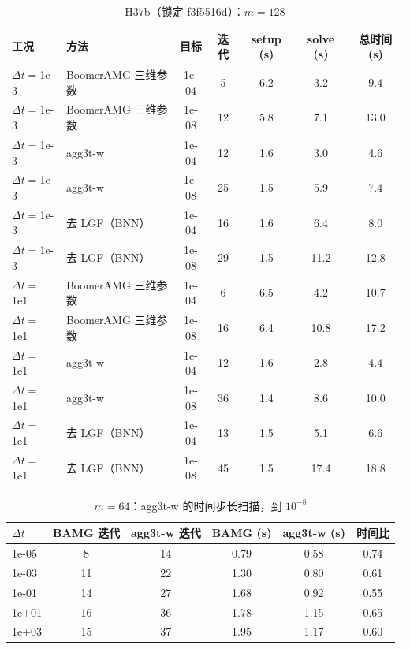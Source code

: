 \begin{table}[H]\centering\small
\caption{H37b（锁定 f3f5516d）：$m=128$}\label{tab:h37b}
\begin{tabular}{llccccc}
\toprule
工况 & 方法 & 目标 & 迭代 & setup (s) & solve (s) & 总时间 (s) \\
\midrule
$\Delta t=$1e-3 & BoomerAMG 三维参数 & 1e-04 & 5 & 6.2 & 3.2 & 9.4 \\
$\Delta t=$1e-3 & BoomerAMG 三维参数 & 1e-08 & 12 & 5.8 & 7.1 & 13.0 \\
$\Delta t=$1e-3 & agg3t-w & 1e-04 & 12 & 1.6 & 3.0 & 4.6 \\
$\Delta t=$1e-3 & agg3t-w & 1e-08 & 25 & 1.5 & 5.9 & 7.4 \\
$\Delta t=$1e-3 & 去 LGF（BNN） & 1e-04 & 16 & 1.6 & 6.4 & 8.0 \\
$\Delta t=$1e-3 & 去 LGF（BNN） & 1e-08 & 29 & 1.5 & 11.2 & 12.8 \\
$\Delta t=$1e1 & BoomerAMG 三维参数 & 1e-04 & 6 & 6.5 & 4.2 & 10.7 \\
$\Delta t=$1e1 & BoomerAMG 三维参数 & 1e-08 & 16 & 6.4 & 10.8 & 17.2 \\
$\Delta t=$1e1 & agg3t-w & 1e-04 & 12 & 1.6 & 2.8 & 4.4 \\
$\Delta t=$1e1 & agg3t-w & 1e-08 & 36 & 1.4 & 8.6 & 10.0 \\
$\Delta t=$1e1 & 去 LGF（BNN） & 1e-04 & 13 & 1.5 & 5.1 & 6.6 \\
$\Delta t=$1e1 & 去 LGF（BNN） & 1e-08 & 45 & 1.5 & 17.4 & 18.8 \\
\bottomrule
\end{tabular}
\end{table}

\begin{table}[H]\centering\small
\caption{$m=64$：agg3t-w 的时间步长扫描，到 $10^{-8}$}\label{tab:dtb}
\begin{tabular}{lccccc}
\toprule
$\Delta t$ & BAMG 迭代 & agg3t-w 迭代 & BAMG (s) & agg3t-w (s) & 时间比 \\
\midrule
1e-05 & 8 & 14 & 0.79 & 0.58 & 0.74 \\
1e-03 & 11 & 22 & 1.30 & 0.80 & 0.61 \\
1e-01 & 14 & 27 & 1.68 & 0.92 & 0.55 \\
1e+01 & 16 & 36 & 1.78 & 1.15 & 0.65 \\
1e+03 & 15 & 37 & 1.95 & 1.17 & 0.60 \\
\bottomrule
\end{tabular}
\end{table}
